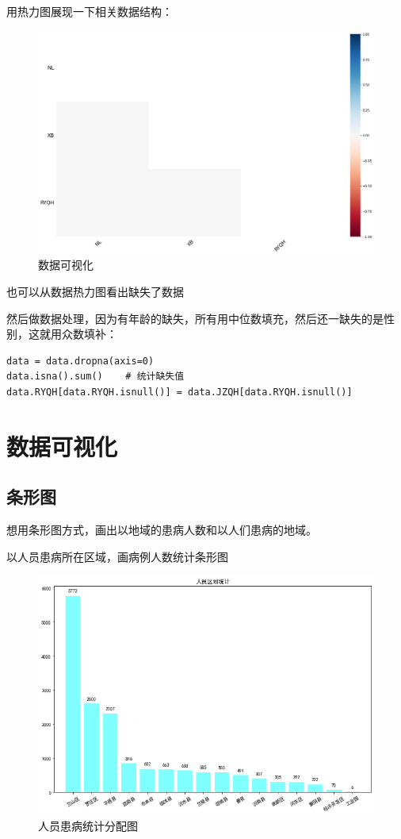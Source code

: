 \documentclass[12pt]{article}
\begin{document}
用热力图展现一下相关数据结构：
\begin{figure}[ht]
\centering
\includegraphics[scale=0.4]{figures/1.png}
\caption{数据可视化}\label{fig:label2}
\end{figure}

也可以从数据热力图看出缺失了数据

然后做数据处理，因为有年龄的缺失，所有用中位数填充，然后还一缺失的是性别，这就用众数填补：
\begin{lstlisting}
data = data.dropna(axis=0)
data.isna().sum()    # 统计缺失值
data.RYQH[data.RYQH.isnull()] = data.JZQH[data.RYQH.isnull()]
\end{lstlisting}

\section{数据可视化}

\subsection{条形图}
想用条形图方式，画出以地域的患病人数和以人们患病的地域。

以人员患病所在区域，画病例人数统计条形图

\newpage
\begin{figure}[ht]
\centering
\includegraphics[scale=0.4]{figures/3.png}
\caption{人员患病统计分配图}\label{fig:label2}
\end{figure}
\end{document}
